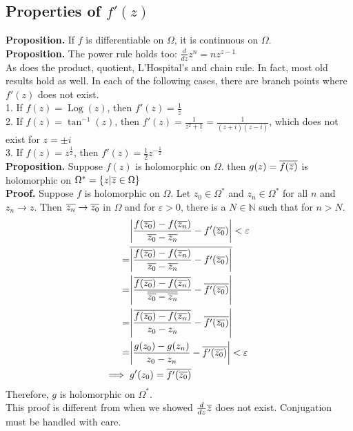 \documentclass[11pt]{article}
\DeclarePairedDelimiter\abs{\lvert}{\rvert}
\begin{document}
\subsection{Properties of $f'(z)$}
\textbf{Proposition.} If $f$ is differentiable on $\Omega$, it is continuous on $\Omega$. \\
\textbf{Proposition.} The power rule holds too: $\frac{d}{dz}z^n = nz^{z - 1}$\\
As does the product, quotient, L'Hospital's and chain rule. In fact, most old results hold as well. 
In each of the following cases, there are branch points where $f'(z)$ does not exist. \\
1. If $f(z) = \operatorname{Log}(z)$, then $f'(z) = \frac{1}{z}$ \\
2. If $f(z) = \tan^{-1}(z)$, then $f'(z) = \frac{1}{z^2 + 1} = \frac{1}{(z + i)(z - i)}$, which does not exist for $z = \pm i$ \\
3. If $f(z) = z^\frac{1}{2}$, then $f'(z) = \frac{1}{2}z^{-\frac{1}{2}}$ \\

\textbf{Proposition.} Suppose $f(z)$ is holomorphic on $\Omega$. then $g(z) = \overline{f(\overline{z})}$ is holomorphic on $\Omega^{\ast} = \{z|\overline{z} \in \Omega\}$ \\
\textbf{Proof.} Suppose $f$ is holomorphic on $\Omega$. Let $z_0 \in \Omega^{\ast}$ and $z_n \in \Omega^{\ast}$ for all $n$ and $z_n \to z$. Then $\overline{z_n} \to \overline{z_0}$ in $\Omega$ and for $\varepsilon > 0$, there is a $N \in \mathbb{N}$ such that for $n > N$. 
\begin{align*}
&\abs*{\frac{f(\conj{z_0}) - f(\conj{z_n})}{\conj{z_0} - \conj{z_n}} - f'(\conj{z_0})} < \varepsilon \\
= &\conj{\abs*{\frac{f(\conj{z_0}) - f(\conj{z_n})}{\conj{z_0} - \conj{z_n}} - f'(\conj{z_0})}} \\
= &\abs*{\frac{\conj{{f(\conj{z_0}) - f(\conj{z_n})}}}{\conj{\conj{z_0} - \conj{z_n}}} - \conj{f'(\conj{z_0})}} \\
= &\abs*{\frac{\conj{{f(\conj{z_0}) - f(\conj{z_n})}}}{z_0 - z_n} - \conj{f'(\conj{z_0})}} \\
= &\abs*{\frac{g(z_0) - g(z_n)}{z_0 - z_n} - \conj{f'(\conj{z_0})}} < \varepsilon \\
\Longrightarrow \hspace{2mm} &g'(z_0) = \conj{f'(\conj{z_0})}
\end{align*}
Therefore, $g$ is holomorphic on $\Omega^\ast$. \\
This proof is different from when we showed $\frac{d}{dz}\overline{z}$ does not exist. Conjugation must be handled with care. 
\end{document}
